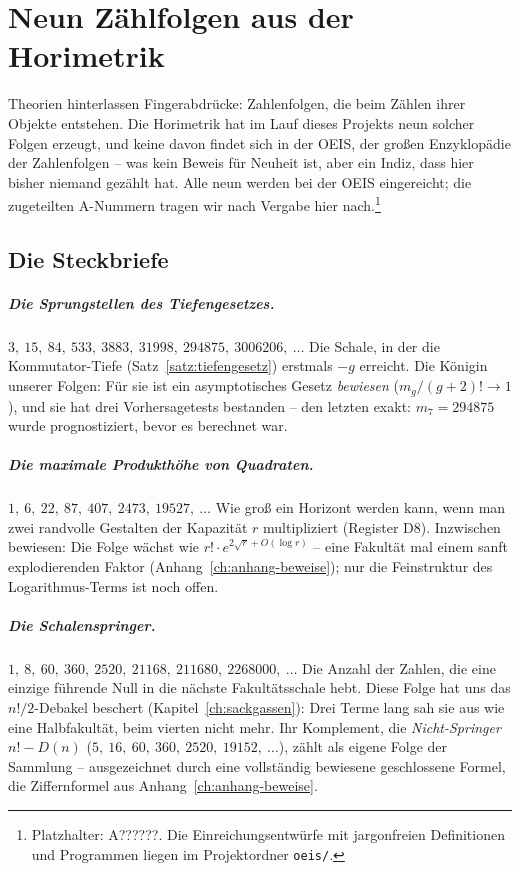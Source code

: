 \chapter{Neun Zählfolgen aus der Horimetrik}
\label{ch:zaehlungen}


Theorien hinterlassen Fingerabdrücke: Zahlenfolgen, die beim Zählen
ihrer Objekte entstehen. Die Horimetrik hat im Lauf dieses Projekts
neun solcher Folgen erzeugt, und keine davon findet sich in der
OEIS, der großen Enzyklopädie der Zahlenfolgen -- was kein Beweis
für Neuheit ist, aber ein Indiz, dass hier bisher niemand gezählt
hat. Alle neun werden bei der OEIS eingereicht; die zugeteilten
A-Nummern tragen wir nach Vergabe hier nach.\footnote{Platzhalter:
A??????. Die Einreichungsentwürfe mit jargonfreien Definitionen und
Programmen liegen im Projektordner \texttt{oeis/}.}

\section{Die Steckbriefe}

\paragraph{Die Sprungstellen des Tiefengesetzes.}
$3,\ 15,\ 84,\ 533,\ 3883,\ 31998,\ 294875,\ 3006206,\ \ldots$
Die Schale, in der die Kommutator-Tiefe
(Satz~\ref{satz:tiefengesetz}) erstmals $-g$ erreicht.
Die Königin unserer Folgen: Für sie ist ein asymptotisches Gesetz
\emph{bewiesen} ($m_g/(g+2)!\to1$), und sie hat drei Vorhersagetests
bestanden -- den letzten exakt: $m_7=294875$ wurde prognostiziert,
bevor es berechnet war.

\paragraph{Die maximale Produkthöhe von Quadraten.}
$1,\ 6,\ 22,\ 87,\ 407,\ 2473,\ 19527,\ \ldots$
Wie groß ein Horizont werden kann, wenn man zwei randvolle
Gestalten der Kapazität $r$ multipliziert (Register D8). Inzwischen bewiesen: Die Folge wächst wie
$r!\cdot e^{2\sqrt r+O(\log r)}$ -- eine Fakultät mal einem sanft
explodierenden Faktor (Anhang~\ref{ch:anhang-beweise}); nur die
Feinstruktur des Logarithmus-Terms ist noch offen.

\paragraph{Die Schalenspringer.}
$1,\ 8,\ 60,\ 360,\ 2520,\ 21168,\ 211680,\ 2268000,\ \ldots$
Die Anzahl der Zahlen, die eine einzige führende Null in die
nächste Fakultätsschale hebt. Diese Folge hat uns das
$n!/2$-Debakel beschert (Kapitel~\ref{ch:sackgassen}): Drei Terme
lang sah sie aus wie eine Halbfakultät, beim vierten nicht mehr.
Ihr Komplement, die \emph{Nicht-Springer} $n!-D(n)$
($5,\ 16,\ 60,\ 360,\ 2520,\ 19152,\ \ldots$), zählt als eigene
Folge der Sammlung -- ausgezeichnet durch eine vollständig
bewiesene geschlossene Formel, die Ziffernformel aus
Anhang~\ref{ch:anhang-beweise}.

